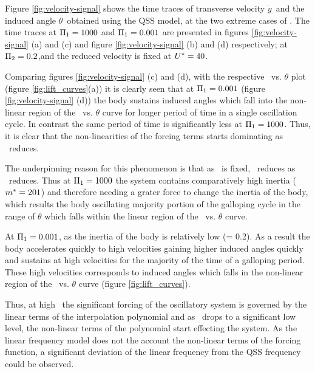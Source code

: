           


Figure \ref{fig:velocity-signal} shows the time traces of transverse velocity $\dot{y}$\ and the induced angle $\theta$\ obtained using the QSS model, at the two extreme cases of \massstiff. The time traces at $\Pi_1=1000$ and $\Pi_1=0.001$ are presented in figures  \ref{fig:velocity-signal} (a) and (c) and  figure \ref{fig:velocity-signal} (b) and (d) respectively; at $\Pi_2=0.2$,and the reduced velocity is fixed at $U^{*}=40$.

Comparing figures \ref{fig:velocity-signal} (c) and (d), with the respective \cy\ vs. $\theta$ plot (figure \ref{fig:lift_curves}(a)) it is clearly seen that at $\Pi_1=0.001$ (figure \ref{fig:velocity-signal} (d)) the body sustains induced angles which fall into the non-linear region of the \cy\ vs. $\theta$ curve for longer period of time in a single oscillation cycle. In contrast the same period of time is significantly less at $\Pi_1=1000$. Thus, it is clear that the non-linearities of the forcing terms starts dominating as \massstiff\ reduces. 

The underpinning reason for this phenomenon is that as \massdamp\ is fixed, \mstar\ reduces as \massstiff\ reduces. Thus at $\Pi_1=1000$ the system contains comparatively high inertia ($m^{*}=201$) and therefore needing a grater force  to change the inertia of the body, which results the body oscillating majority portion of the galloping cycle in the range of $\theta$ which falls within the linear region of the \cy\ vs. $\theta$ curve.

 At $\Pi_1=0.001$, as the inertia of the body is relatively low (\mstar= 0.2). As a result the body accelerates quickly to high velocities gaining higher induced angles quickly and sustains at high velocities for the majority of the time of a galloping period. These high velocities corresponds to induced angles which falls in the non-linear  region of the \cy\ vs. $\theta$ curve (figure \ref{fig:lift_curves}). 

Thus, at high \massstiff\, the significant forcing of the oscillatory system is governed by the linear terms of the interpolation polynomial and as \massstiff\ drops to a significant low level, the non-linear terms of the polynomial start effecting the system. As the linear frequency model does not the account the non-linear terms of the forcing function, a significant deviation of the linear frequency from the QSS frequency could be observed.   

